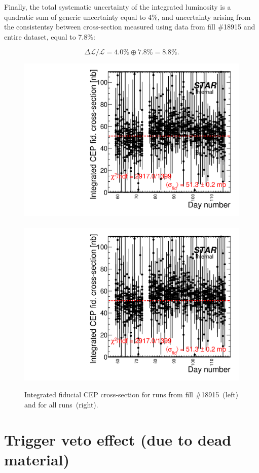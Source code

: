 Finally, the total systematic uncertainty of the integrated luminosity is a quadratic sum of generic uncertainty equal to 4\%, and uncertainty arising from the consistentsy between cross-section measured using data from fill \#18915 and entire dataset, equal to 7.8\%:

\begin{equation}
\Delta\mathcal{L}/\mathcal{L} = 4.0\%\oplus7.8\% = 8.8\%. 
\end{equation}


% 
% 
% 
% 
% 
% 
% 
% 
% 



\begin{figure}[h]
\centering
\includegraphics[width=.48\textwidth,page=2]{graphics/systematics/sigmaVsRunNumber.pdf}~~~~%
\includegraphics[width=.48\textwidth,page=1]{graphics/systematics/sigmaVsRunNumber.pdf}%
\caption[Luminosity uncertainty systematics.]{Integrated fiducial CEP cross-section for runs from fill \#18915~(left) and for all runs~(right).}
\label{fig:lumiSyst}
\end{figure}


\section{Trigger veto effect (due to dead material)}\label{sec:systTrigVeto}

